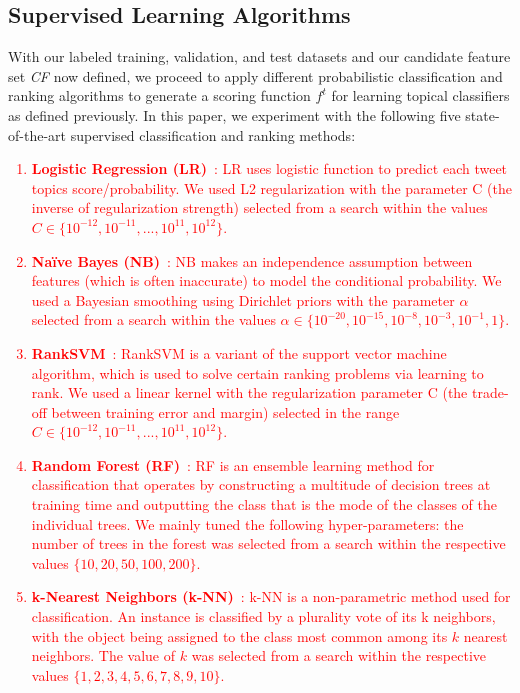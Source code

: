 
\subsection*{Supervised Learning Algorithms}

With our labeled training, validation, and test datasets 
and our candidate feature set \textit{CF} now defined, we proceed to apply different probabilistic classification and ranking
algorithms to generate a scoring function $f^t$ for learning topical classifiers 
as defined previously.
In this paper, we experiment with 
the following five state-of-the-art supervised classification and ranking methods:
\textcolor{red}{
\begin{enumerate}
\item {\bf Logistic Regression (LR)}~\cite{liblinear}: LR uses logistic function to predict each tweet topics score/probability. We used L2 regularization with the parameter C (the inverse of regularization strength) selected from a search within the values $C \in \{10^{-12}, 10^{-11}, ..., 10^{11}, 10^{12}\}$.
\item {\bf Na\"{i}ve Bayes (NB)}~\cite{mccallum98nb}: NB makes an independence assumption between features (which is often inaccurate) to model the conditional probability. We used a Bayesian smoothing using Dirichlet priors with the parameter $\alpha$ selected from a search within the values $\alpha \in \{10^{-20}, 10^{-15}, 10^{-8}, 10^{-3}, 10^{-1}, 1\}$.
\item {\bf RankSVM}~\cite{largescale_ranksvm}: RankSVM is a variant of the support vector machine algorithm, which is used to solve certain ranking problems via learning to rank.  We used a linear kernel with the regularization parameter C (the trade-off between training error and margin) selected in the range $C \in \{10^{-12}, 10^{-11}, ..., 10^{11}, 10^{12}\}$.
\item {\bf Random Forest (RF)}~\cite{Breiman2001}: RF is an ensemble learning method for classification that operates by constructing a multitude of decision trees at training time and outputting the class that is the mode of the classes of the individual trees. We mainly tuned the following hyper-parameters: the number of trees in the forest was selected from a search within the respective values $\{10, 20, 50, 100, 200\}$.
\item {\bf k-Nearest Neighbors (k-NN)}~\cite{Aha1991}: k-NN is a non-parametric method used for classification. An instance is classified by a plurality vote of its k neighbors, with the object being assigned to the class most common among its $k$ nearest neighbors. The value of $k$ was selected from a search within the respective values $\{1, 2, 3, 4, 5, 6, 7, 8, 9, 10\}$.
\end{enumerate}
}
